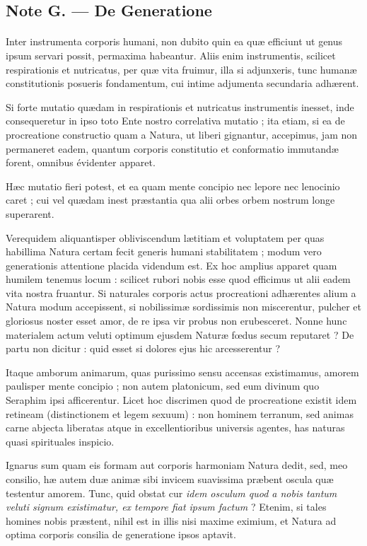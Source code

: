 \documentclass[a4paper, 11pt, oneside]{article}
\begin{document}
\subsection{Note G. --- De Generatione}
\paragraph{}
Inter instrumenta corporis humani, non dubito quin ea quæ efficiunt ut genus ipsum servari possit, permaxima habeantur. Aliis enim instrumentis, scilicet respirationis et nutricatus, per quæ vita fruimur, illa si adjunxeris, tunc humanæ constitutionis posueris fondamentum, cui intime adjumenta secundaria adhærent.

Si forte mutatio quædam in respirationis et nutricatus instrumentis inesset, inde consequeretur in ipso toto Ente nostro correlativa mutatio ; ita etiam, si ea de procreatione constructio quam a Natura, ut liberi gignantur, accepimus, jam non permaneret eadem, quantum corporis constitutio et conformatio immutandæ forent, omnibus évidenter apparet.

Hæc mutatio fieri potest, et ea quam mente concipio nec lepore nec lenocinio caret ; cui vel quædam inest præstantia qua alii orbes orbem nostrum longe superarent.

Verequidem aliquantisper obliviscendum lætitiam et voluptatem per quas habillima Natura certam fecit generis humani stabilitatem ; modum vero generationis attentione placida videndum est. Ex hoc amplius apparet quam humilem tenemus locum : scilicet rubori nobis esse quod efficimus ut alii eadem vita nostra fruantur. Si naturales corporis actus procreationi adhærentes alium a Natura modum accepissent, si nobilissimæ sordissimis non miscerentur, pulcher et gloriosus noster esset amor, de re ipsa vir probus non erubesceret. Nonne hunc materialem actum veluti optimum ejusdem Naturæ fœdus secum reputaret ? De partu non dicitur : quid esset si dolores ejus hic arcesserentur ?

Itaque amborum animarum, quas purissimo sensu accensas existimamus, amorem paulisper mente concipio ; non autem platonicum, sed eum divinum quo Seraphim ipsi afficerentur. Licet hoc discrimen quod de procreatione existit idem retineam (distinctionem et legem sexuum) : non hominem terranum, sed animas carne abjecta liberatas atque in excellentioribus universis agentes, has naturas quasi spirituales inspicio.

Ignarus sum quam eis formam aut corporis harmoniam Natura dedit, sed, meo consilio, hæ autem duæ animæ sibi invicem suavissima præbent oscula quæ testentur amorem. Tunc, quid obstat cur \emph{idem osculum quod a nobis tantum veluti signum existimatur, ex tempore fiat ipsum factum} ? Etenim, si tales homines nobis præstent, nihil est in illis nisi maxime eximium, et Natura ad optima corporis consilia de generatione ipsos aptavit.
\end{document}
